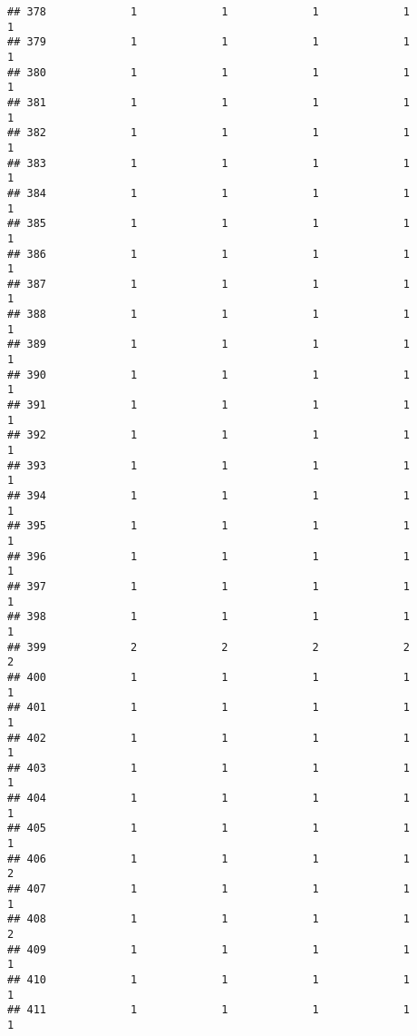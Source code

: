 \documentclass[
]{article}
\begin{document}
\begin{verbatim}
## 378             1             1             1             1             1
## 379             1             1             1             1             1
## 380             1             1             1             1             1
## 381             1             1             1             1             1
## 382             1             1             1             1             1
## 383             1             1             1             1             1
## 384             1             1             1             1             1
## 385             1             1             1             1             1
## 386             1             1             1             1             1
## 387             1             1             1             1             1
## 388             1             1             1             1             1
## 389             1             1             1             1             1
## 390             1             1             1             1             1
## 391             1             1             1             1             1
## 392             1             1             1             1             1
## 393             1             1             1             1             1
## 394             1             1             1             1             1
## 395             1             1             1             1             1
## 396             1             1             1             1             1
## 397             1             1             1             1             1
## 398             1             1             1             1             1
## 399             2             2             2             2             2
## 400             1             1             1             1             1
## 401             1             1             1             1             1
## 402             1             1             1             1             1
## 403             1             1             1             1             1
## 404             1             1             1             1             1
## 405             1             1             1             1             1
## 406             1             1             1             1             2
## 407             1             1             1             1             1
## 408             1             1             1             1             2
## 409             1             1             1             1             1
## 410             1             1             1             1             1
## 411             1             1             1             1             1

\end{verbatim}
\end{document}
